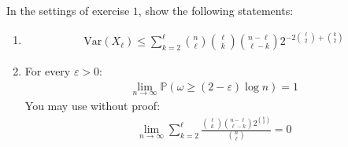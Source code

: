 \begin{problem}
  In the settings of exercise $1$, show the following statements:
  \begin{enumerate}[label=(\roman*)]
    \item 
      \begin{align*}
        \text{Var}(X_{\ell}) \leq \sum_{k=2}^{\ell} \binom{n}{\ell} \binom{\ell}{k} \binom{n-\ell}{\ell-k} 2^{-2 \binom{\ell}{2} + \binom{k}{2}}
      \end{align*}
    \item For every $\varepsilon > 0$:
      \begin{align*}
        \lim\limits_{n \to \infty} \mathbb{P}(\omega  \geq (2-\varepsilon) \log n) = 1
      \end{align*}
      You may use without proof:
      \begin{align*}
        \lim\limits_{n \to \infty} \sum_{k=2}^{\ell} \frac{\binom{\ell}{k} \binom{n-\ell}{\ell-k} 2^{\binom{k}{2}}}{\binom{n}{\ell}} = 0
      \end{align*}
  \end{enumerate}
\end{problem}
